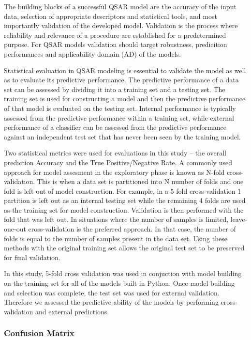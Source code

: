 The building blocks of a successful QSAR model are the accuracy of the input data, selection of appropriate descriptors and statistical tools, and most importantly validation of the developed model. Validation is the process where reliability and relevance of a procedure are established for a predetermined purpose. For QSAR models validation should target robustness, predicition performances and applicability domain (AD) of the models. \cite{Lapins2013}

Statistical evaluation in QSAR modeling is essential to validate the model as well as to evaluate its predictive performance. The predictive performance of a data set can be assessed by dividing it into a training set and a testing set. The training set is used for constructing a model and then the predictive performance of that model is evaluated on the testing set. Internal performance is typically assessed from the predictive performance within a training set, while external performance of a classifier can be assessed from the predictive performance against an independent test set that has never been seen by the training model. 

Two statistical metrics were used for evaluations in this study -- the overall prediction Accuracy and the True Positive/Negative Rate. A commonly used approach for model assesment in the exploratory phase is known as N-fold cross-validation. This is when a data set is partitioned into N number of folds and one fold is left out of model construction. For example, in a 5-fold cross-validation 1 partition is left out as an internal testing set while the remaining 4 folds are used as the training set for model construction. Validation is then performed with the fold that was left out. In situations where the number of samples is limited, leave-one-out cross-validation is the preferred approach. In that case, the number of folds is equal to the number of samples present in the data set. \cite{Nantasenamat2009} Using these methods with the original training set allows the original test set to be preserved for final validation.

In this study, 5-fold cross validation was used in conjuction with model building on the training set for all of the models built in Python. Once model building and selection was complete, the test set was used for external validation. Therefore we assessed the predictive ability of the models by performing cross-validation and external predictions.

\subsubsection{Confusion Matrix}

